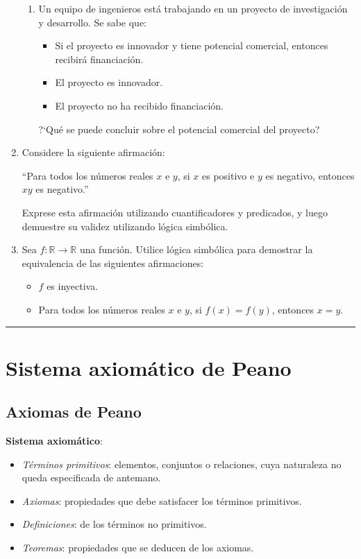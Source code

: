 \begin{enumerate}[label=\textbf{\arabic*}.]
\begin{enumerate}
		\item Un equipo de ingenieros está trabajando en un proyecto de investigación y desarrollo. Se sabe que:
		
		\begin{itemize}[itemsep=-3pt]
			\item Si el proyecto es innovador y tiene potencial comercial, entonces recibirá financiación.
			\item El proyecto es innovador.
			\item El proyecto no ha recibido financiación.
		\end{itemize}
		?`Qué se puede concluir sobre el potencial comercial del proyecto?
	\end{enumerate}
	
	\item Considere la siguiente afirmación:
	
	``Para todos los números reales $x$ e $y$, si $x$ es positivo e $y$ es negativo, entonces $xy$ es negativo.''
	
	Exprese esta afirmación utilizando cuantificadores y predicados, y luego demuestre su validez utilizando lógica simbólica.
	
	\item Sea $f: \mathbb{R} \rightarrow \mathbb{R}$ una función. Utilice lógica simbólica para demostrar la equivalencia de las siguientes afirmaciones:
	\begin{itemize}[itemsep=-3pt]
		\item $f$ es inyectiva.
		\item Para todos los números reales $x$ e $y$, si $f(x) = f(y)$, entonces $x = y$.
	\end{itemize}
\end{enumerate}

\rule{\textwidth}{.5pt}

\section{Sistema axiomático de Peano} 

\subsection{Axiomas de Peano}
\textbf{Sistema axiomático}:

\begin{itemize}
	\item \textit{Términos primitivos}: elementos, conjuntos o relaciones, cuya naturaleza no queda especificada de antemano.
	\item \textit{Axiomas}: propiedades que debe satisfacer los términos primitivos.
	\item \textit{Definiciones}: de los términos no primitivos.
	\item \textit{Teoremas}: propiedades que se deducen de los axiomas.
\end{itemize}

